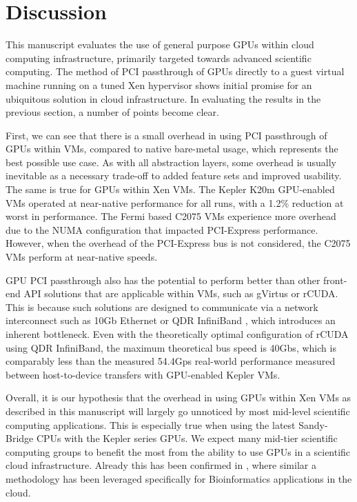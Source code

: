 \section{Discussion}

This manuscript evaluates the use of general purpose GPUs within cloud computing infrastructure, primarily targeted towards advanced scientific computing. The method of PCI passthrough of GPUs directly to a guest virtual machine running on a tuned Xen hypervisor shows initial promise for an ubiquitous solution in cloud infrastructure. In evaluating the results in the previous section, a number of points become clear. 

First, we can see that there is a small overhead in using PCI passthrough of GPUs within VMs, compared to native bare-metal usage, which represents the best possible use case. As with all abstraction layers, some overhead is usually inevitable as a necessary trade-off to added feature sets and improved usability. The same is true for GPUs within Xen VMs.  The Kepler K20m GPU-enabled VMs operated at near-native performance for all runs, with a 1.2\% reduction at worst in performance. The Fermi based C2075 VMs experience more overhead due to the NUMA configuration that impacted PCI-Express performance. However, when the overhead of the PCI-Express bus is not considered, the C2075 VMs perform at near-native speeds. %

GPU PCI passthrough also has the potential to perform better than other front-end API solutions that are applicable within VMs, such as gVirtus or rCUDA. This is because such solutions are designed to communicate via a network interconnect such as 10Gb Ethernet or QDR InfiniBand  \cite{rCUDAMellanox}, which introduces an inherent bottleneck. Even with the theoretically optimal configuration of rCUDA using QDR InfiniBand, the maximum theoretical bus speed is 40Gbs, which is comparably less than the measured 54.4Gps real-world performance measured between host-to-device transfers with  GPU-enabled Kepler VMs.  


Overall, it is our hypothesis that the overhead in using GPUs within Xen VMs as described in this manuscript will largely go unnoticed by most mid-level scientific computing applications.  This is especially true when using the latest Sandy-Bridge CPUs with the Kepler series GPUs.  We expect many mid-tier scientific computing groups to benefit the most from the ability to use GPUs in a scientific cloud infrastructure. Already this has been confirmed in \cite{jo2013exploiting}, where similar a methodology has been leveraged specifically for Bioinformatics applications in the cloud. 


